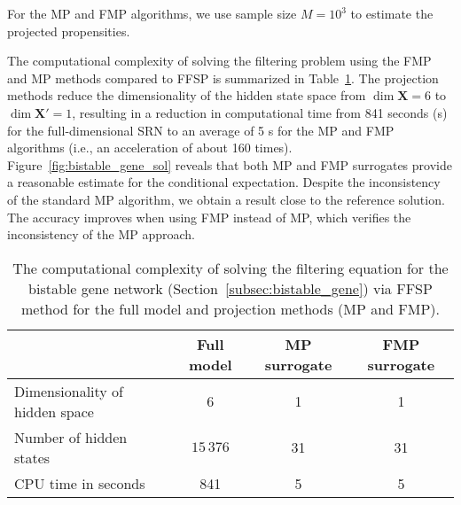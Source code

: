  For the \ac{MP} and \ac{FMP} algorithms, we use sample size $M=10^3$ to estimate the projected propensities.

The computational complexity of solving the filtering problem using the \ac{FMP} and \ac{MP} methods compared to \ac{FFSP} is summarized in Table~\ref{tab:bistable_network_results}. The projection methods reduce the dimensionality of the hidden state space from $\dim{\boldsymbol{X}} = 6$ to $\dim{\boldsymbol{X}'} = 1$, resulting in a reduction in computational time from 841 seconds (s) for the full-dimensional \ac{SRN} to an average of 5 s for the \ac{MP} and \ac{FMP} algorithms (i.e., an acceleration of about 160 times). Figure~\ref{fig:bistable_gene_sol} reveals that both \ac{MP} and \ac{FMP} surrogates provide a reasonable estimate for the conditional expectation. Despite the inconsistency of the standard \ac{MP} algorithm, we obtain a result close to the reference solution. The accuracy improves when using \ac{FMP} instead of \ac{MP}, which verifies the inconsistency of the \ac{MP} approach.

\begin{table}%
    \centering 
    \def\arraystretch{1.25}
    \begin{tabular}{|l|c|c|c|} \cline{2-4}
        \multicolumn{1}{c|}{} & \textbf{Full model} & \textbf{\ac{MP} surrogate} & \textbf{\ac{FMP} surrogate} \\ \hline
        {Dimensionality of hidden space} & 6 & 1 & 1 \\ \hline
        {Number of hidden states} & $15 \, 376$ & 31 & 31 \\ \hline
        {CPU time in seconds} & 841 & 5 & 5 \\ \hline
    \end{tabular}
    \caption{The computational complexity of solving the filtering equation for the bistable gene network (Section~\ref{subsec:bistable_gene}) via \ac{FFSP} method for the full model and projection methods (\ac{MP} and \ac{FMP}).}
    \label{tab:bistable_network_results}
\end{table}














